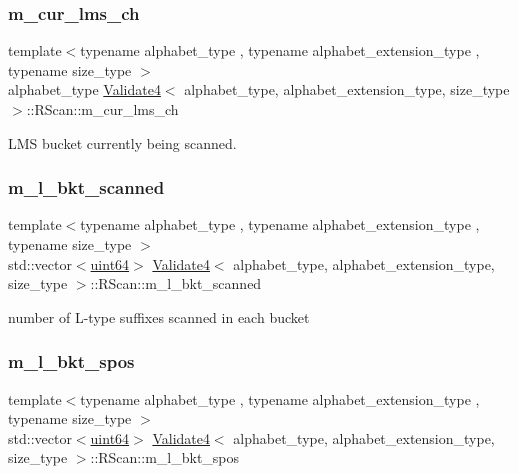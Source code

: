 \subsubsection{\texorpdfstring{m\+\_\+cur\+\_\+lms\+\_\+ch}{m\_cur\_lms\_ch}}
{\footnotesize\ttfamily template$<$typename alphabet\+\_\+type , typename alphabet\+\_\+extension\+\_\+type , typename size\+\_\+type $>$ \\
alphabet\+\_\+type \hyperlink{class_validate4}{Validate4}$<$ alphabet\+\_\+type, alphabet\+\_\+extension\+\_\+type, size\+\_\+type $>$\+::R\+Scan\+::m\+\_\+cur\+\_\+lms\+\_\+ch\hspace{0.3cm}{\ttfamily [private]}}



L\+MS bucket currently being scanned. 

\mbox{\label{struct_validate4_1_1_r_scan_ace00679285e1e6082440d2485809f0cf}} 
\subsubsection{\texorpdfstring{m\+\_\+l\+\_\+bkt\+\_\+scanned}{m\_l\_bkt\_scanned}}
{\footnotesize\ttfamily template$<$typename alphabet\+\_\+type , typename alphabet\+\_\+extension\+\_\+type , typename size\+\_\+type $>$ \\
std\+::vector$<$\hyperlink{types_8h_a60e8696a4678cd348e991a1f172e53f7}{uint64}$>$ \hyperlink{class_validate4}{Validate4}$<$ alphabet\+\_\+type, alphabet\+\_\+extension\+\_\+type, size\+\_\+type $>$\+::R\+Scan\+::m\+\_\+l\+\_\+bkt\+\_\+scanned\hspace{0.3cm}{\ttfamily [private]}}



number of L-\/type suffixes scanned in each bucket 

\mbox{\label{struct_validate4_1_1_r_scan_ab9a643ec01afe4e6d3455ff025aeb612}} 
\subsubsection{\texorpdfstring{m\+\_\+l\+\_\+bkt\+\_\+spos}{m\_l\_bkt\_spos}}
{\footnotesize\ttfamily template$<$typename alphabet\+\_\+type , typename alphabet\+\_\+extension\+\_\+type , typename size\+\_\+type $>$ \\
std\+::vector$<$\hyperlink{types_8h_a60e8696a4678cd348e991a1f172e53f7}{uint64}$>$ \hyperlink{class_validate4}{Validate4}$<$ alphabet\+\_\+type, alphabet\+\_\+extension\+\_\+type, size\+\_\+type $>$\+::R\+Scan\+::m\+\_\+l\+\_\+bkt\+\_\+spos\hspace{0.3cm}{\ttfamily [private]}}



